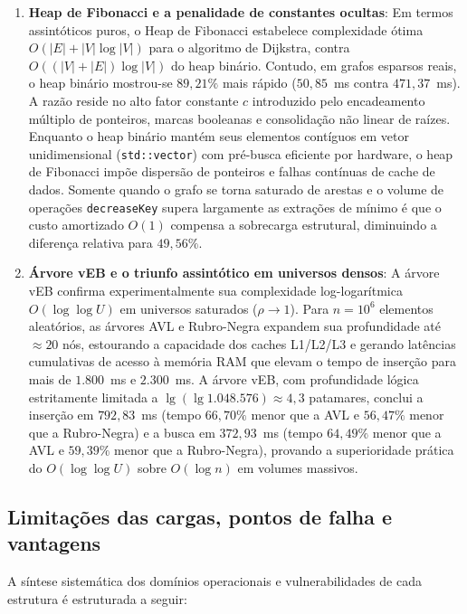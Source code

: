 \documentclass[12pt,a4paper]{report}
\begin{document}
\begin{enumerate}
  \item \textbf{Heap de Fibonacci e a penalidade de constantes ocultas}: Em termos assintóticos puros, o Heap de Fibonacci estabelece complexidade ótima $O(|E| + |V| \log |V|)$ para o algoritmo de Dijkstra, contra $O((|V| + |E|) \log |V|)$ do heap binário. Contudo, em grafos esparsos reais, o heap binário mostrou-se $89{,}21\%$ mais rápido ($50{,}85$~ms contra $471{,}37$~ms). A razão reside no alto fator constante $c$ introduzido pelo encadeamento múltiplo de ponteiros, marcas booleanas e consolidação não linear de raízes. Enquanto o heap binário mantém seus elementos contíguos em vetor unidimensional (\texttt{std::vector}) com pré-busca eficiente por hardware, o heap de Fibonacci impõe dispersão de ponteiros e falhas contínuas de cache de dados. Somente quando o grafo se torna saturado de arestas e o volume de operações \texttt{decreaseKey} supera largamente as extrações de mínimo é que o custo amortizado $O(1)$ compensa a sobrecarga estrutural, diminuindo a diferença relativa para $49{,}56\%$.
  \item \textbf{Árvore vEB e o triunfo assintótico em universos densos}: A árvore vEB confirma experimentalmente sua complexidade log-logarítmica $O(\log \log U)$ em universos saturados ($\rho \to 1$). Para $n = 10^6$ elementos aleatórios, as árvores AVL e Rubro-Negra expandem sua profundidade até $\approx 20$ nós, estourando a capacidade dos caches L1/L2/L3 e gerando latências cumulativas de acesso à memória RAM que elevam o tempo de inserção para mais de $1.800$~ms e $2.300$~ms. A árvore vEB, com profundidade lógica estritamente limitada a $\lg(\lg 1.048.576) \approx 4{,}3$ patamares, conclui a inserção em $792{,}83$~ms (tempo $66{,}70\%$ menor que a AVL e $56{,}47\%$ menor que a Rubro-Negra) e a busca em $372{,}93$~ms (tempo $64{,}49\%$ menor que a AVL e $59{,}39\%$ menor que a Rubro-Negra), provando a superioridade prática do $O(\log \log U)$ sobre $O(\log n)$ em volumes massivos.
\end{enumerate}

\subsection{Limitações das cargas, pontos de falha e vantagens}

A síntese sistemática dos domínios operacionais e vulnerabilidades de cada estrutura é estruturada a seguir:
\end{document}
